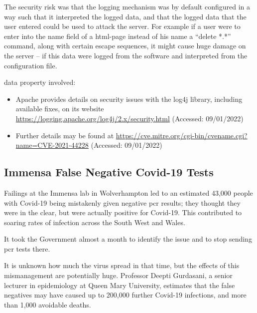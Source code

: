 The security risk was that the logging mechanism was by default configured in a way such that it interpreted the logged data,
and that the logged data that the user entered could be used to attack the server.
For example if a user were to enter into the name field of a html-page instead of his name a ``delete *.*'' command, along with certain escape sequences,
it might cause huge damage on the server -- if this data were logged from the software and interpreted from the configuration file.

\Gls{data property} involved: 

\begin{itemize}
  \item Apache provides details on security issues with the log4j library, including available fixes, on its website \href{https://logging.apache.org/log4j/2.x/security.html}{https://logging.apache.org/log4j/2.x/security.html} (Accessed: 09/01/2022)
  \item Further details may be found at \href{https://cve.mitre.org/cgi-bin/cvename.cgi?name=CVE-2021-44228}{https://cve.mitre.org/cgi-bin/cvename.cgi?name=CVE-2021-44228} (Accessed: 09/01/2022)
\end{itemize}

\subsection{Immensa False Negative Covid-19  Tests} \label{bkm:incacc:immensa}
Failings at the Immensa lab in Wolverhampton led to an estimated 43,000 people with Covid-19 being mistakenly given negative \gls{pcr} results;
they thought they were in the clear, but were actually positive for Covid-19.
This contributed to soaring rates of infection across the South West and Wales.

It took the Government almost a month to identify the issue and to stop sending \gls{pcr} tests there.

It is unknown how much the virus spread in that time, but the effects of this mismanagement are potentially huge.
Professor Deepti Gurdasani, a senior lecturer in epidemiology at Queen Mary University,
estimates that the false negatives may have caused up to 200,000 further Covid-19 infections, and more than 1,000 avoidable deaths.

